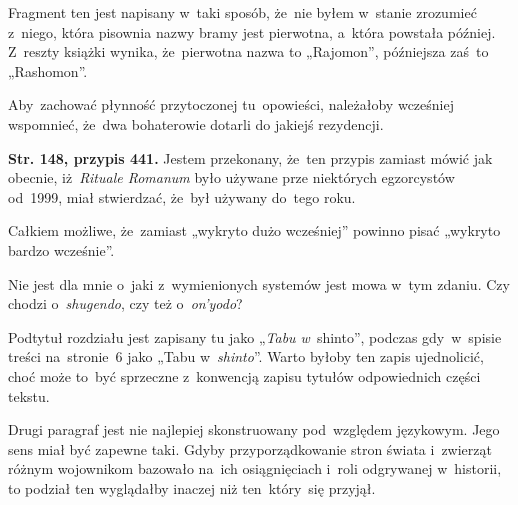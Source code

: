 \documentclass[a4paper,11pt]{article}
\begin{document}
\start {} Fragment ten jest napisany w~taki sposób,
że~nie byłem w~stanie zrozumieć z~niego, która pisownia nazwy bramy
jest pierwotna, a~która powstała później. Z~reszty książki wynika,
że~pierwotna nazwa to „Rajomon”, %
późniejsza zaś~to „Rashomon”. %

\vspace{\spaceFour}



\start {} Aby~zachować płynność przytoczonej
tu~opowieści, należałoby wcześniej wspomnieć, że~dwa bohaterowie
dotarli do jakiejś rezydencji.

\vspace{\spaceFour}



\start \textbf{Str. 148, przypis 441.} Jestem przekonany, że~ten przypis
zamiast mówić jak obecnie, iż~\textit{Rituale Romanum} było używane prze
niektórych egzorcystów od~1999, miał stwierdzać, że~był używany
do~tego roku.

\vspace{\spaceFour}



\start {} Całkiem możliwe, że~zamiast „wykryto dużo
wcześniej” powinno pisać „wykryto bardzo wcześnie”.

\vspace{\spaceFour}



\start {} Nie jest dla mnie o~jaki z~wymienionych systemów
jest mowa w~tym zdaniu. Czy chodzi o~\textit{shugendo}, %
czy też o~\textit{on'yodo}? %

\vspace{\spaceFour}



\start {} Podtytuł rozdziału jest zapisany tu jako „\textit{Tabu
  w}~shinto”, %
podczas gdy~w~spisie treści na~stronie~6 jako „Tabu
w~\textit{shinto}”. %
Warto byłoby ten zapis ujednolicić, choć może to~być sprzeczne
z~konwencją zapisu tytułów odpowiednich części tekstu.

\vspace{\spaceFour}



\start {} Drugi paragraf jest nie najlepiej skonstruowany
pod~względem językowym. Jego sens miał być zapewne taki. Gdyby
przyporządkowanie stron świata i~zwierząt różnym wojownikom bazowało
na~ich osiągnięciach i~roli odgrywanej w~historii, to podział ten
wyglądałby inaczej niż ten~który~się przyjął.
\end{document}
